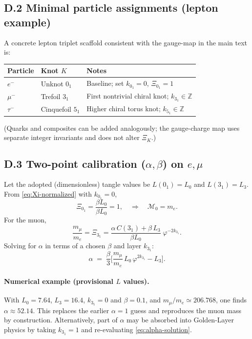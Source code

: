 \documentclass[smallextended]{svjour3}       %
\begin{document}
		\subsection*{D.2 Minimal particle assignments (lepton example)}
		A concrete lepton triplet scaffold consistent with the gauge-map in the main text is:
		\begin{center}
		\begin{tabular}{lll}
		\toprule
		Particle & Knot \(K\) & Notes \\
		\midrule
		\(e^-\)  & Unknot \(0_1\) & Baseline; set \(k_{0_1}=0\), \(\Xi_{0_1}=1\) \\
		\(\mu^-\) & Trefoil \(3_1\) & First nontrivial chiral knot; \(k_{3_1}\in\mathbb{Z}\) \\
		\(\tau^-\) & Cinquefoil \(5_1\) & Higher chiral torus knot; \(k_{5_1}\in\mathbb{Z}\) \\
		\bottomrule
		\end{tabular}
		\end{center}
		(Quarks and composites can be added analogously; the gauge-charge map uses separate integer invariants and does not alter \(\Xi_K\).)

		\subsection*{D.3 Two-point calibration (\texorpdfstring{\(\alpha,\beta\)}{alpha,beta}) on \texorpdfstring{\(e,\mu\)}{e,mu}}
		Let the adopted (dimensionless) tangle values be
		\(L(0_1)=L_0\) and \(L(3_1)=L_3\).
		From \eqref{eq:Xi-normalized} with \(k_{0_1}=0\),
		\[
		\Xi_{0_1}=\frac{\beta L_0}{\beta L_0}=1,
		\quad\Rightarrow\quad \mathcal{M}_0=m_e.
		\]
		For the muon,
		\[
		\frac{m_\mu}{m_e}
		= \Xi_{3_1}
        = \frac{\alpha\,C(3_1)+\beta\,L_3}{\beta L_0}\;\varphi^{-2k_{3_1}}.
		\]
		Solving for \(\alpha\) in terms of a chosen \(\beta\) and layer \(k_{3_1}\):
		\begin{equation}
		\alpha
		\;=\; \frac{\beta}{3}\Bigg[\frac{m_\mu}{m_e}\,L_0\,\varphi^{2k_{3_1}} - L_3\Bigg].
		\label{eq:alpha-solution}
		\end{equation}

		\paragraph{Numerical example (provisional \(L\) values).}
		With \(L_0=7.64\), \(L_3=16.4\), \(k_{3_1}=0\) and \(\beta=0.1\),
		and \(m_\mu/m_e\simeq 206.768\),
		one finds \(\alpha \approx 52.14\).
		This replaces the earlier \(\alpha=1\) guess and reproduces the muon mass by construction.
		Alternatively, part of \(\alpha\) may be absorbed into Golden-Layer physics by taking \(k_{3_1}=1\) and re-evaluating \eqref{eq:alpha-solution}.
\end{document}
